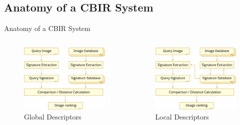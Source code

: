 \documentclass{beamer}
\begin{document}
\subsection{Anatomy of a CBIR System}
\begin{frame}{Anatomy of a CBIR System}
    \begin{columns}
        \begin{column}{0.5\textwidth}
            \begin{figure}
                \includegraphics[width=.9\textwidth]{illustrations/cbir_anatomy_query_cropped}
                \caption{Global Descriptors}
                \label{fig:anatomy_global}
            \end{figure}
        \end{column}
        \begin{column}{0.5\textwidth}
            \begin{figure}
                \includegraphics[width=.9\textwidth]{illustrations/cbir_anatomy_query_local_cropped}
                \caption{Local Descriptors}
                \label{fig:anatomy_local}
            \end{figure}
        \end{column}
    \end{columns}
\end{frame}
\end{document}

